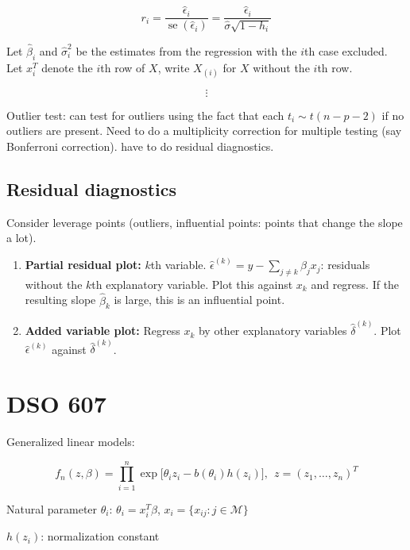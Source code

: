 \[
r_i = \frac{\hat{\epsilon}_i}{\operatorname{se}(\hat{\epsilon}_i)} =  \frac{\hat{\epsilon}_i}{\hat{\sigma}\sqrt{1 - h_i}} 
\]

Let \(\hat{\beta}_i\) and \(\hat{\sigma}_i^2\) be the estimates from the regression with the \(i\)th case excluded. Let \(x_i^T\) denote the \(i\)th row of \(X\), write \(X_{(i)}\) for \(X\) without the \(i\)th row.

\[
\vdots
\]

Outlier test: can test for outliers using the fact that each \(t_i \sim t(n-p-2)\) if no outliers are present. Need to do a multiplicity correction for multiple testing (say Bonferroni correction). have to do residual diagnostics.

\subsection{Residual diagnostics}

Consider leverage points (outliers, influential points: points that change the slope a lot). 

\begin{enumerate}

\item \textbf{Partial residual plot:} \(k\)th variable. \(\hat{\epsilon}^{(k)} = y - \sum_{j \neq k} \beta_j x_j\): residuals without the \(k\)th explanatory variable. Plot this against \(x_k\) and regress. If the resulting slope \(\hat{\beta}_k\) is large, this is an influential point.

\item \textbf{Added variable plot:}  Regress \(x_k\) by other explanatory variables \(\hat{\delta}^{(k)}\). Plot \(\hat{\epsilon}^{(k)}\) against \(\hat{\delta}^{(k)}\).

\end{enumerate}

%
%
%
%
%
%
%

\section{DSO 607}

Generalized linear models:

\[
f_n(z, \beta) = \prod_{i=1}^n \exp \big[ \theta_i z_i - b(\theta_i) h(z_i) \big], \ \ z = (z_1, \ldots, z_n)^T
\]

Natural parameter \(\theta_i\): \(\theta_i = x_i^T \beta\), \(x_i = \{x_{ij}: j \in \mathscr{M} \}\)

\(h(z_i)\): normalization constant

